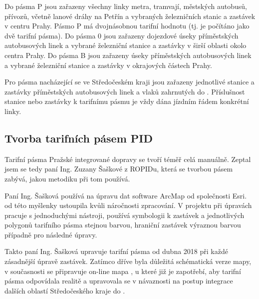 Do pásma P jsou zařazeny všechny linky metra, tramvají, městských autobusů, přívozů,
včetně lanové dráhy na Petřín a vybraných železničních stanic a zastávek v centru Prahy.
Pásmo P má dvojnásobnou tarifní hodnotu (tj. je počítáno jako dvě tarifní pásma).
Do pásma 0 jsou zařazeny dojezdové úseky příměstských autobusových linek a vybrané
železniční stanice a zastávky v širší oblasti okolo centra Prahy.
Do pásma B jsou zařazeny úseky příměstských autobusových linek a vybrané 
železniční stanice a zastávky v okrajových částech Prahy. \cite{pid} 

Pro pásma nacházející se ve Středočeském kraji jsou zařazeny jednotlivé stanice 
a zastávky příměstských autobusových linek  a vlaků zahrnutých do . 
Příslušnost stanice nebo zastávky k tarifnímu pásmu je vždy dána jízdním řádem konkrétní linky.\cite{pid}

\subsection{Tvorba tarifních pásem PID}

Tarifní pásma Pražské integrované dopravy se tvoří téměř celá manuálně. Zeptal jsem
se tedy paní Ing. Zuzany Šaškové z ROPIDu, která se tvorbou pásem zabývá, jakou metodiku
při tom používá. 

Paní Ing. Šašková používá na úpravu dat software ArcMap od společnosti Esri.
\textit{} od této
myšlenky ustoupila kvůli náročnosti zpracování. \textit{}
V projektu při úpravách pracuje s jednoduchými nástroji, používá symbologii k 
zastávek a jednotlivých polygonů tarifního pásma stejnou barvou, hraniční zastávek výraznou barvou 
případně pro následné úpravy. \textit{}

Takto paní Ing. Šašková upravuje tarifní pásma od dubna 2018 při každé zásadnější úpravě zastávek. 
Zatímco dříve byla důležitá schématická verze mapy, v současnosti se připravuje on-line mapa , u které již je zapotřebí, 
aby tarifní pásma odpovídala realitě a upravovala se v návaznosti na postup
integrace dalších oblastí Středočeského kraje do .

